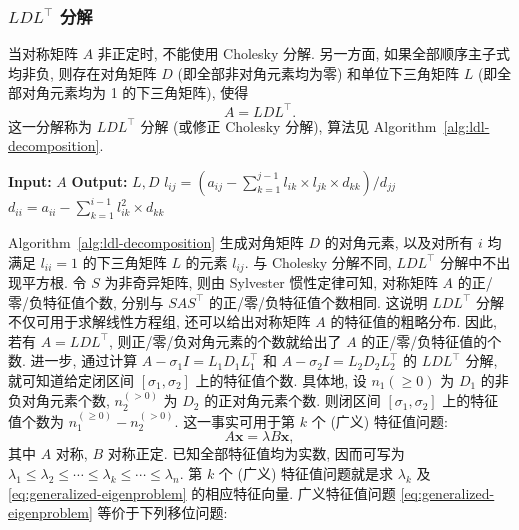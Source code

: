 \subsubsection{{$LDL^\top$ 分解}}\label{subsec:ldl-decomposition}
{当对称矩阵 $A$ 非正定时, 不能使用 Cholesky 分解. 另一方面, 如果全部顺序主子式均非负, 则存在对角矩阵 $D$ (即全部非对角元素均为零) 和单位下三角矩阵 $L$ (即全部对角元素均为 1 的下三角矩阵), 使得}
\[A=LDL^\top.\]
{这一分解称为 $LDL^\top$ 分解 (或修正 Cholesky 分解), 算法见 Algorithm~\ref{alg:ldl-decomposition}.}
\begin{algorithm}[H]
\caption{{$LDL^\top$ 分解}}\label{alg:ldl-decomposition}
\begin{algorithmic}[1]
\Statex\textbf{Input:} $A$
\Statex\textbf{Output:} $L,D$
\State $l_{ij}=(a_{ij}-\sum_{k=1}^{j-1}l_{ik}\times l_{jk}\times d_{kk})/d_{jj}$
\EndFor
\State $d_{ii}=a_{ii}-\sum_{k=1}^{i-1}l_{ik}^2\times d_{kk}$
\EndFor
\end{algorithmic}
\end{algorithm}
{\leavevmode{}\label{idx:chapter-01-section-04:inertia-and-eigenvalue-count}Algorithm~\ref{alg:ldl-decomposition} 生成对角矩阵 $D$ 的对角元素, 以及对所有 $i$ 均满足 $l_{ii}=1$ 的下三角矩阵 $L$ 的元素 $l_{ij}$. 与 Cholesky 分解不同, $LDL^\top$ 分解中不出现平方根.}
{令 $S$ 为非奇异矩阵, 则由 Sylvester 惯性定律可知, 对称矩阵 $A$ 的正/零/负特征值个数, 分别与 $SAS^\top$ 的正/零/负特征值个数相同. 这说明 $LDL^\top$ 分解不仅可用于求解线性方程组, 还可以给出对称矩阵 $A$ 的特征值的粗略分布. 因此, 若有 $A=LDL^\top$, 则正/零/负对角元素的个数就给出了 $A$ 的正/零/负特征值的个数.}
{进一步, 通过计算 $A-\sigma_1 I=L_1D_1L_1^\top$ 和 $A-\sigma_2 I=L_2D_2L_2^\top$ 的 $LDL^\top$ 分解, 就可知道给定闭区间 $[\sigma_1,\sigma_2]$ 上的特征值个数. 具体地, 设 $n_1(\ge0)$ 为 $D_1$ 的非负对角元素个数, $n_2^{(>0)}$ 为 $D_2$ 的正对角元素个数. 则闭区间 $[\sigma_1,\sigma_2]$ 上的特征值个数为 $n_1^{(\ge0)}-n_2^{(>0)}$.}
{这一事实可用于第 $k$ 个 (广义) 特征值问题:}
\begin{equation}\label{eq:generalized-eigenproblem}A\bm x=\lambda B\bm x,\end{equation}
{其中 $A$ 对称, $B$ 对称正定. 已知全部特征值均为实数, 因而可写为 $\lambda_1\le\lambda_2\le\cdots\le\lambda_k\le\cdots\le\lambda_n$. 第 $k$ 个 (广义) 特征值问题就是求 $\lambda_k$ 及 \eqref{eq:generalized-eigenproblem} 的相应特征向量. 广义特征值问题 \eqref{eq:generalized-eigenproblem} 等价于下列移位问题:}
